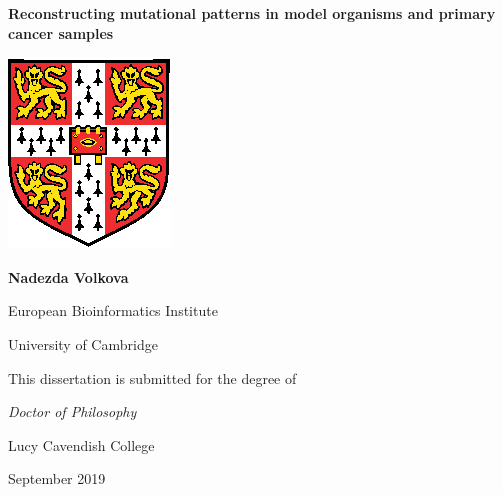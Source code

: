 \documentclass[12pt,a4paper,twoside]{book}
\begin{document}
\pagestyle{empty}
\begin{titlepage}
\begin{center}

\bigskip
{\Huge

  \textbf{Reconstructing mutational patterns in model organisms and primary cancer samples}
}


\vspace*{10mm}

\includegraphics[scale=2]{University_Crest.eps}

\bigskip

\vspace*{20mm}

\normalsize
{\Large
\textbf{Nadezda Volkova}
}
\vspace*{30mm}

European Bioinformatics Institute

University of Cambridge

\vspace*{30mm}

This dissertation is submitted for the degree of 

\textit{Doctor of Philosophy}

\end{center}

\vspace*{20mm}

Lucy Cavendish College

September 2019

\end{titlepage}

\null\newpage







\tableofcontents
\end{document}
